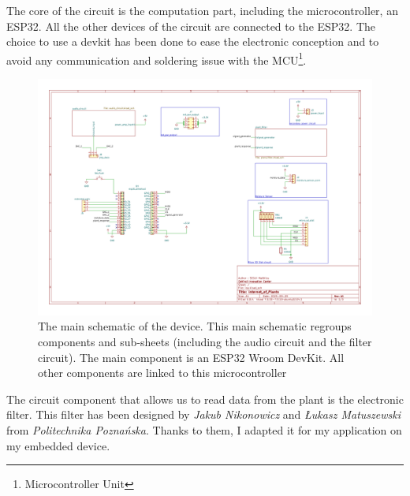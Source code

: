 The core of the circuit is the computation part, including the microcontroller, an ESP32. All the other
devices of the circuit are connected to the ESP32. The choice to use a devkit has been done 
to ease the electronic conception and to avoid any communication and soldering issue with the MCU\footnote[1]{Microcontroller Unit}.

\begin{figure}[h!]
    \centering
    \includegraphics[width=\textwidth]{images/iop.pdf}
    \caption{The main schematic of the device. This main schematic regroups components and sub-sheets (including the audio circuit
    and the filter circuit). The main component is an ESP32 Wroom DevKit. All other components are linked to this
    microcontroller} 
    \vspace{0.1cm}
    \label{fig:iop_schematic_main}
\end{figure}


The circuit component that allows us to read data from the plant is the electronic filter.
This filter has been designed by \textit{Jakub Nikonowicz} and \textit{Łukasz Matuszewski} 
from \textit{Politechnika Poznańska}.
Thanks to them, I adapted it for my application on my embedded device. 


